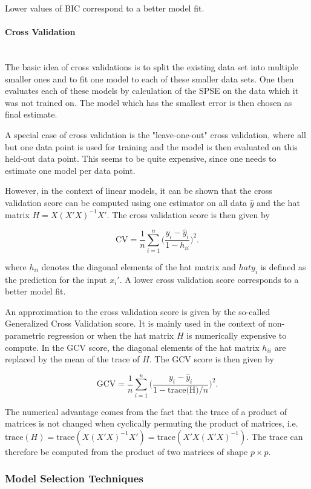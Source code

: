 \documentclass[10pt,a4paper]{article}
\newcommand{\subsubsubsection}[1]{\paragraph{#1}\mbox{}\\}
\begin{document}
Lower values of BIC correspond to a better model fit.

\subsubsubsection{Cross Validation}

The basic idea of cross validations is to split the existing data set into multiple smaller ones and to fit one model to each of these smaller data sets. One then evaluates each of these models by calculation of the SPSE on the data which it was not trained on. The model which has the smallest error is then chosen as final estimate. 

A special case of cross validation is the "leave-one-out" cross validation, where all but one data point is used for training and the model is then evaluated on this held-out data point. This seems to be quite expensive, since one needs to estimate one model per data point. 

However, in the context of linear models, it can be shown that the cross validation score can be computed using one estimator on all data $\hat y$ and the hat matrix $H = X(X'X)^{-1}X'$. The cross validation score is then given by

$$\text{CV} = \frac{1}{n} \sum_{i=1}^n\big( \frac{y_i - \hat y_i}{1 - h_{ii}}\big)^2.$$

where $h_{ii}$ denotes the diagonal elements of the hat matrix and $hat y_i$ is defined as the prediction for the input $x_i'$. A lower cross validation score corresponds to a better model fit.

An approximation to the cross validation score is given by the so-called Generalized Cross Validation score. It is mainly used in the context of non-parametric regression or when the hat matrix $H$ is numerically expensive to compute. In the GCV score, the diagonal elements of the hat matrix $h_{ii}$ are replaced by the mean of the trace of $H$. The GCV score is then given by

$$\text{GCV} = \frac{1}{n}\sum_{i=1}^n \Big( \frac{y_i - \hat y_i}{1 - \text{trace(H)}/n}\Big)^2.$$

The numerical advantage comes from the fact that the trace of a product of matrices is not changed when cyclically permuting the product of matrices, i.e. $\text{trace}(H) = \text{trace}(X(X'X)^{-1}X') = \text{trace}(X'X(X'X)^{-1})$. The trace can therefore be computed from the product of two matrices of shape $p\times p$.

\subsubsection{Model Selection Techniques}
\end{document}

